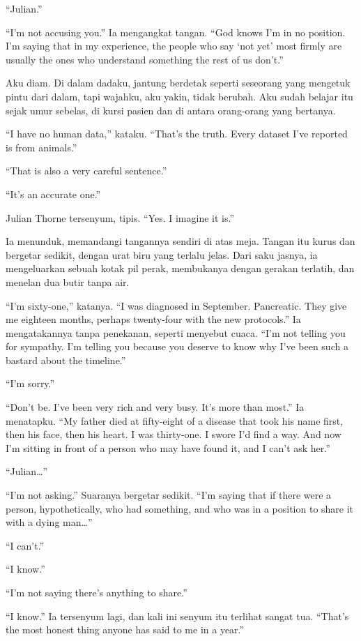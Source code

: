 \documentclass[11pt,twoside,openany]{book}
\begin{document}
``Julian.''

``I'm not accusing you.'' Ia mengangkat tangan. ``God knows I'm in no position. I'm saying that in my experience, the people who say `not yet' most firmly are usually the ones who understand something the rest of us don't.''

Aku diam. Di dalam dadaku, jantung berdetak seperti seseorang yang mengetuk pintu dari dalam, tapi wajahku, aku yakin, tidak berubah. Aku sudah belajar itu sejak umur sebelas, di kursi pasien dan di antara orang-orang yang bertanya.

``I have no human data,'' kataku. ``That's the truth. Every dataset I've reported is from animals.''

``That is also a very careful sentence.''

``It's an accurate one.''

Julian Thorne tersenyum, tipis. ``Yes. I imagine it is.''

Ia menunduk, memandangi tangannya sendiri di atas meja. Tangan itu kurus dan bergetar sedikit, dengan urat biru yang terlalu jelas. Dari saku jasnya, ia mengeluarkan sebuah kotak pil perak, membukanya dengan gerakan terlatih, dan menelan dua butir tanpa air.

``I'm sixty-one,'' katanya. ``I was diagnosed in September. Pancreatic. They give me eighteen months, perhaps twenty-four with the new protocols.'' Ia mengatakannya tanpa penekanan, seperti menyebut cuaca. ``I'm not telling you for sympathy. I'm telling you because you deserve to know why I've been such a bastard about the timeline.''

``I'm sorry.''

``Don't be. I've been very rich and very busy. It's more than most.'' Ia menatapku. ``My father died at fifty-eight of a disease that took his name first, then his face, then his heart. I was thirty-one. I swore I'd find a way. And now I'm sitting in front of a person who may have found it, and I can't ask her.''

``Julian\ldots{}''

``I'm not asking.'' Suaranya bergetar sedikit. ``I'm saying that if there were a person, hypothetically, who had something, and who was in a position to share it with a dying man\ldots{}''

``I can't.''

``I know.''

``I'm not saying there's anything to share.''

``I know.'' Ia tersenyum lagi, dan kali ini senyum itu terlihat sangat tua. ``That's the most honest thing anyone has said to me in a year.''
\end{document}
